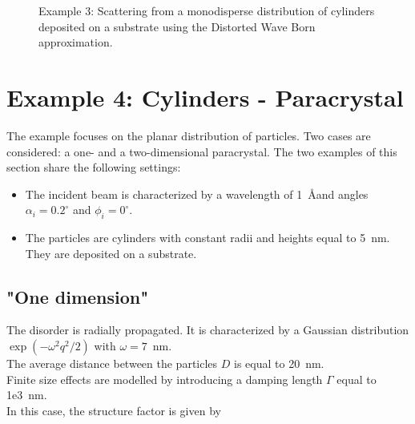 \begin{figure}[H]
\hfill
{}
\hfill
{}
\hfill
\caption{Example 3: Scattering from a monodisperse distribution of cylinders deposited on a substrate using the Distorted Wave Born approximation.}
\label{fig:PythonEx3DWBA}
\end{figure}

\newpage
\section{Example 4: Cylinders - Paracrystal}
The example focuses on the planar distribution of particles. Two cases are considered: a one- and a two-dimensional paracrystal. 
The two examples of this section share the following settings:
\begin{itemize}
\item The incident beam is characterized by a wavelength of 1~\AA and angles $\alpha_i=0.2^{\circ}$ and $\phi_i=0^{\circ}$.
\item The particles are cylinders with constant radii and heights equal to 5~nm. They are deposited on a substrate.
\end{itemize}

\subsection{"One dimension"}
The disorder is radially propagated. It is characterized by a Gaussian distribution $\exp(-\omega^2q^2/2)$ with $\omega=7$~nm.\\ The average distance between the particles $D$ is equal to  20~nm.\\ Finite size effects are modelled by introducing a damping length $\Gamma$ equal to 1e3~nm.\\
In this case, the structure factor is given by

